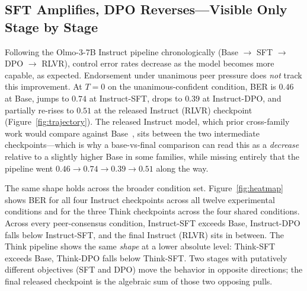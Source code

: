 \documentclass{article}
\begin{document}
\subsection{SFT Amplifies, DPO Reverses---Visible Only Stage by Stage}
\label{sec:stage_decomp}

\noindent Following the Olmo-3-7B Instruct pipeline chronologically (Base $\to$ SFT $\to$ DPO $\to$ RLVR), control error rates decrease as the model becomes more capable, as expected. Endorsement under unanimous peer pressure does \emph{not} track this improvement. At $T{=}0$ on the unanimous-confident condition, BER is $0.46$ at Base, jumps to $0.74$ at Instruct-SFT, drops to $0.39$ at Instruct-DPO, and partially re-rises to $0.51$ at the released Instruct (RLVR) checkpoint (Figure~\ref{fig:trajectory}). The released Instruct model, which prior cross-family work would compare against Base~\citep{zhu2025conformity}, sits between the two intermediate checkpoints---which is why a base-vs-final comparison can read this as a \emph{decrease} relative to a slightly higher Base in some families, while missing entirely that the pipeline went $0.46 \to 0.74 \to 0.39 \to 0.51$ along the way.

The same shape holds across the broader condition set. Figure~\ref{fig:heatmap} shows BER for all four Instruct checkpoints across all twelve experimental conditions and for the three Think checkpoints across the four shared conditions. Across every peer-consensus condition, Instruct-SFT exceeds Base, Instruct-DPO falls below Instruct-SFT, and the final Instruct (RLVR) sits in between. The Think pipeline shows the same \emph{shape} at a lower absolute level: Think-SFT exceeds Base, Think-DPO falls below Think-SFT. Two stages with putatively different objectives (SFT and DPO) move the behavior in opposite directions; the final released checkpoint is the algebraic sum of those two opposing pulls.
\end{document}
